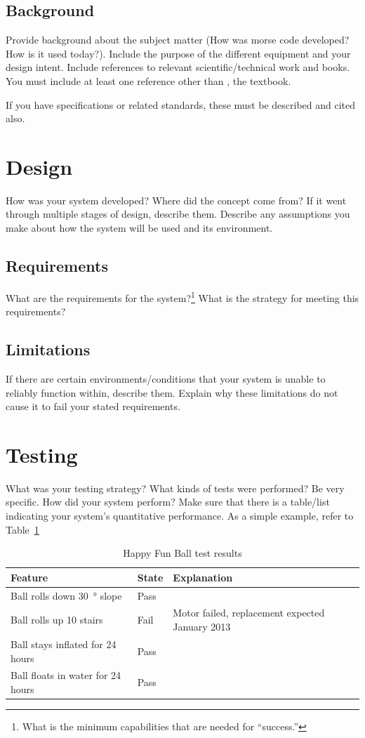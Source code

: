 \documentclass[svn, draft]{rureport}
\begin{document}
\subsection{Background}
Provide background about the subject matter (How was morse code
developed?  How is it used today?). Include the purpose of the
different equipment and your design intent. Include references to
relevant scientific/technical work and books.  You must include at
least one reference other than \cite{carryer2011IntroMechatronics},
the textbook.

If you have specifications or related standards, these must be
described and cited also.


\section{Design}
How was your system developed?  Where did the concept come from?  If
it went through multiple stages of design, describe them. Describe any
assumptions you make about how the system will be used and its
environment.

\subsection{Requirements}
What are the requirements for the system?\footnote{What is the minimum
capabilities that are needed for ``success.''}  What is the strategy
for meeting this requirements?


\subsection{Limitations\label{Limitations}}
If there are certain environments/conditions that your system is
unable to reliably function within, describe them.  Explain why these
limitations do not cause it to fail your stated requirements.

\section{Testing}
What was your testing strategy?  What kinds of tests were performed? Be very specific.  How did your system perform?  Make sure that there is a table/list indicating your system's quantitative performance. As a simple example, refer to Table~\ref{table:testing}

\begin{table}
\centering
\begin{tabular}{|l|l|l|}\hline
{\bf Feature} &{\bf State} &{\bf Explanation}\\\hline
Ball rolls down \SI{30}{\degree} slope &Pass &\\\hline
Ball rolls up 10 stairs   &Fail &Motor failed, replacement expected January 2013\\\hline
Ball stays inflated for 24 hours &Pass &\\\hline
Ball floats in water for 24 hours &Pass &\\\hline
\end{tabular}
\caption{Happy Fun Ball test results \label{table:testing}}
\end{table}
\end{document}
